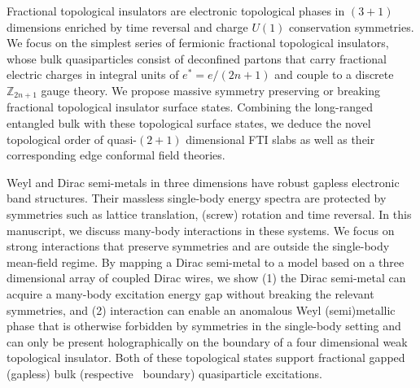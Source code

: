 
Fractional topological insulators are electronic topological phases in $(3+1)$ dimensions enriched by time reversal and charge $U(1)$ conservation symmetries. We focus on the simplest series of fermionic fractional topological insulators, whose bulk quasiparticles consist of deconfined partons that carry fractional electric charges in integral units of $e^\ast=e/(2n+1)$ and couple to a discrete $\mathbb{Z}_{2n+1}$ gauge theory. We propose massive symmetry preserving or breaking fractional topological insulator surface states. Combining the long-ranged entangled bulk with these topological surface states, we deduce the novel topological order of quasi-$(2+1)$ dimensional FTI slabs as well as their corresponding edge conformal field theories. 

Weyl and Dirac semi-metals in three dimensions have robust gapless electronic band structures. Their massless single-body energy spectra are protected by symmetries such as lattice translation, (screw) rotation and time reversal. In this manuscript, we discuss many-body  interactions in these systems. We focus on strong interactions that preserve symmetries and are outside the single-body mean-field regime. By mapping a Dirac semi-metal to a model based on a three dimensional array of coupled Dirac wires, we show (1) the Dirac semi-metal can acquire a many-body excitation energy gap without breaking the relevant symmetries, and (2) interaction can enable an anomalous Weyl (semi)metallic phase that is otherwise forbidden by symmetries in the single-body setting and can only be present holographically on the boundary of a four dimensional weak topological insulator. Both of these topological states support fractional gapped (gapless) bulk (respective ~boundary) quasiparticle excitations. %